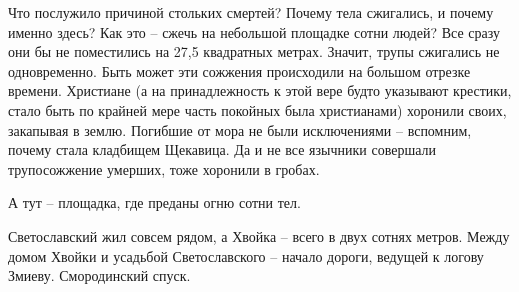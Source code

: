 Что послужило причиной стольких смертей? Почему тела сжигались, и почему именно здесь? Как это – сжечь на небольшой площадке сотни людей? Все сразу они бы не поместились на 27,5 квадратных метрах. Значит, трупы сжигались не одновременно. Быть может эти сожжения происходили на большом отрезке времени. Христиане (а на принадлежность к этой вере будто указывают крестики, стало быть по крайней мере часть покойных была христианами) хоронили своих, закапывая в землю. Погибшие от мора не были исключениями – вспомним, почему стала кладбищем Щекавица. Да и не все язычники совершали трупосожжение умерших, тоже хоронили в гробах.

А тут – площадка, где преданы огню сотни тел.

Светославский жил совсем рядом, а Хвойка – всего в двух сотнях метров. Между домом Хвойки и усадьбой Светославского – начало дороги, ведущей к логову Змиеву. Смородинский спуск.
